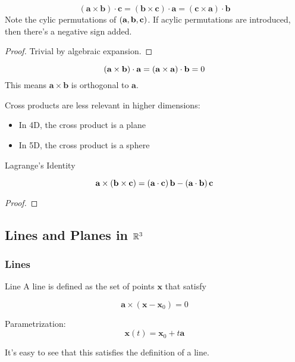 \documentclass[11pt]{article}
\begin{document}
\begin{theorem}
  
  $$
  (\bm{a} \times \bm{b}) \cdot \bm{c} = (\bm{b} \times \bm{c}) \cdot \bm{a} = (\bm{c} \times \bm{a} ) \cdot \bm{b}
  $$
  Note the cylic permutations of $\left ( \textbf{a}, \textbf{b}, \textbf{c} \right)$.
  If acylic permutations are introduced, then there's a negative sign added.
  
  \begin{proof}
    Trivial by algebraic expansion.
  \end{proof}
  
\end{theorem}

\begin{example}

  $$ (\textbf{a} \times \textbf{b}) \cdot \textbf{a} = \left (  \textbf{a} \times \textbf{a} \right) \cdot \textbf{b} = 0$$
  This means $\bm{a} \times \bm{b}$ is orthogonal to $\bm{a}$.
  
\end{example}

Cross products are less relevant in higher dimensions:
\begin{itemize}
\item In 4D, the cross product is a plane
\item In 5D, the cross product is a sphere
\end{itemize}



\begin{theorem}{Lagrange's Identity}
  
  $$
  \textbf{a} \times \left ( \textbf{b} \times \textbf{c}  \right) = \left ( \textbf{a} \cdot \textbf{c} \right) \textbf{b} - \left ( \textbf{a} \cdot \textbf{b} \right) \textbf{c}
  $$

    

  \begin{proof}

    
    
  \end{proof}
\end{theorem}

\subsection{Lines and Planes in $\mathbb R^3$}

\subsubsection{Lines}

\begin{definition}{Line}
  A line is defined as the set of points $\bm{x}$ that satisfy
  
  $$
  \bm{a} \times ( \bm{x} - \bm{x}_0) = 0
  $$

  Parametrization:
  $$\bm{x}(t) = \bm{x}_0 + t \bm{a}$$

  It's easy to see that this satisfies the definition of a line.
\end{definition}
\end{document}
